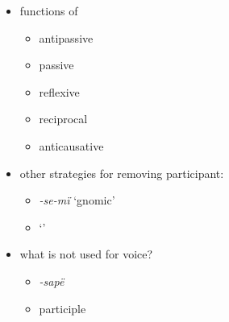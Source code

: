 \documentclass{memoir}
\begin{document}
\begin{itemize}
\tightlist
\item
  functions of 

  \begin{itemize}
  \tightlist
  \item
    antipassive
  \item
    passive
  \item
    reflexive
  \item
    reciprocal
  \item
    anticausative
  \end{itemize}
\item
  other strategies for removing participant:

  \begin{itemize}
  \tightlist
  \item
    \emph{-se-mï} `gnomic'
  \item
     `'
  \end{itemize}
\item
  what is not used for voice?

  \begin{itemize}
  \tightlist
  \item
    \emph{-sapë}
  \item
    participle
  \end{itemize}
\end{itemize}

\printbibliography
\end{document}
